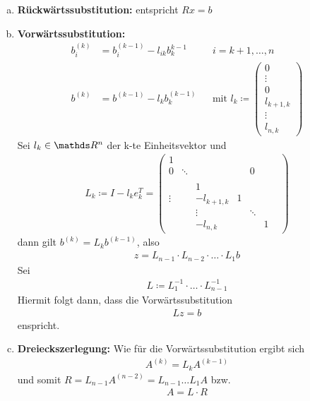 
\begin{enumerate}[a)]
\item \textbf{Rückwärtssubstitution:} entspricht $Rx=b$
\item \textbf{Vorwärtssubstitution:} 
  \begin{align*}
    b^{(k)}_i&=b_i^{(k-1)}-l_{ik}b_k^{k-1} && i=k+1, \dotsc , n\\
    b^{(k)} &= b^{(k-1)}-l_kb_k^{(k-1)} 
                                     && \text{mit }l_k\coloneqq 
                                        \begin{pmatrix}0\\\vdots\\ 0\\ l_{k+1,k}\\\vdots \\l_{n,k}\end{pmatrix}
  \end{align*}
  Sei $l_k\in\R^n$ der k-te Einheitsvektor und 
  \begin{gather}
    L_k \coloneqq I- l_ke_k^T = \begin{pmatrix}
      1&&&&&&\\
      0&\ddots&&&0\\
      \\
      &&1\\
      \vdots&&-l_{k+1,k}&1\\
      &&\vdots&&\ddots \\
      &&-l_{n,k}&&&1
    \end{pmatrix}
    \label{II.1.9}
  \end{gather}
  dann gilt $b^{(k)} =L_kb^{(k-1)}$, also
  \begin{gather*}
    z = L_{n-1}\cdot L_{n-2} \cdot \dots \cdot L_1b
  \end{gather*}
  Sei
  \begin{gather}
    L\coloneqq L_1^{-1} \cdot \dots \cdot L_{n-1}^{-1}
    \label{II.1.10}
  \end{gather}
  Hiermit folgt dann, dass die Vorwärtssubstitution
  \begin{gather}
    Lz=b\label{II.1.11}
  \end{gather}
  enspricht.
\item \textbf{Dreieckszerlegung:} Wie für die Vorwärtssubstitution ergibt sich
  \begin{gather*}
    A^{(k)}=L_kA^{(k-1)}
  \end{gather*}
  und somit $R=L_{n-1}A^{(n-2)}= L_{n-1}\dots L_1A $ bzw.
  \begin{gather} 
    A=L\cdot R
    \label{II.1.12}
  \end{gather}
\end{enumerate}


